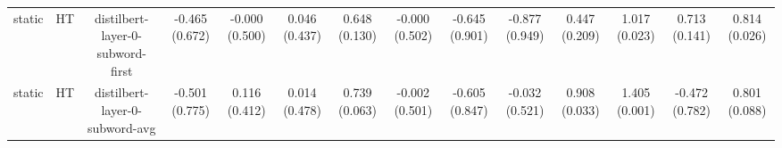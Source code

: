 \begin{sidewaystable}[htb]
\begin{tabular}{@{}cccccccccccccc@{}}
        static & HT & distilbert-layer-0-subword-first & -0.465 (0.672) & -0.000 (0.500) & 0.046 (0.437) & 0.648 (0.130) & -0.000 (0.502) & -0.645 (0.901) & -0.877 (0.949) & 0.447 (0.209) & 1.017 (0.023) & 0.713 (0.141) & 0.814 (0.026) \\
        static & HT & distilbert-layer-0-subword-avg & -0.501 (0.775) & 0.116 (0.412) & 0.014 (0.478) & 0.739 (0.063) & -0.002 (0.501) & -0.605 (0.847) & -0.032 (0.521) & 0.908 (0.033) & 1.405 (0.001) & -0.472 (0.782) & 0.801 (0.088) \\
        \bottomrule
    \end{tabular}
\end{sidewaystable}